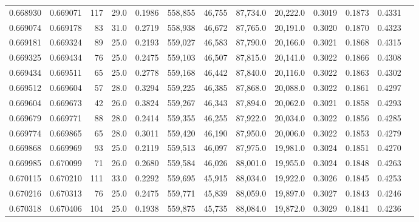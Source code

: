 \begin{tabular}{rrrrrrrrrrrrr}
0.668930 & 0.669071 &   117 & 29.0 &                                     0.1986 & 558,855 &  46,755 &  87,734.0 &  20,222.0 & 0.3019 & 0.1873 & 0.4331 \\
0.669074 & 0.669178 &    83 & 31.0 &                                     0.2719 & 558,938 &  46,672 &  87,765.0 &  20,191.0 & 0.3020 & 0.1870 & 0.4323 \\
0.669181 & 0.669324 &    89 & 25.0 &                                     0.2193 & 559,027 &  46,583 &  87,790.0 &  20,166.0 & 0.3021 & 0.1868 & 0.4315 \\
0.669325 & 0.669434 &    76 & 25.0 &                                     0.2475 & 559,103 &  46,507 &  87,815.0 &  20,141.0 & 0.3022 & 0.1866 & 0.4308 \\
0.669434 & 0.669511 &    65 & 25.0 &                                     0.2778 & 559,168 &  46,442 &  87,840.0 &  20,116.0 & 0.3022 & 0.1863 & 0.4302 \\
0.669512 & 0.669604 &    57 & 28.0 &                                     0.3294 & 559,225 &  46,385 &  87,868.0 &  20,088.0 & 0.3022 & 0.1861 & 0.4297 \\
0.669604 & 0.669673 &    42 & 26.0 &                                     0.3824 & 559,267 &  46,343 &  87,894.0 &  20,062.0 & 0.3021 & 0.1858 & 0.4293 \\
0.669679 & 0.669771 &    88 & 28.0 &                                     0.2414 & 559,355 &  46,255 &  87,922.0 &  20,034.0 & 0.3022 & 0.1856 & 0.4285 \\
0.669774 & 0.669865 &    65 & 28.0 &                                     0.3011 & 559,420 &  46,190 &  87,950.0 &  20,006.0 & 0.3022 & 0.1853 & 0.4279 \\
0.669868 & 0.669969 &    93 & 25.0 &                                     0.2119 & 559,513 &  46,097 &  87,975.0 &  19,981.0 & 0.3024 & 0.1851 & 0.4270 \\
0.669985 & 0.670099 &    71 & 26.0 &                                     0.2680 & 559,584 &  46,026 &  88,001.0 &  19,955.0 & 0.3024 & 0.1848 & 0.4263 \\
0.670115 & 0.670210 &   111 & 33.0 &                                     0.2292 & 559,695 &  45,915 &  88,034.0 &  19,922.0 & 0.3026 & 0.1845 & 0.4253 \\
0.670216 & 0.670313 &    76 & 25.0 &                                     0.2475 & 559,771 &  45,839 &  88,059.0 &  19,897.0 & 0.3027 & 0.1843 & 0.4246 \\
0.670318 & 0.670406 &   104 & 25.0 &                                     0.1938 & 559,875 &  45,735 &  88,084.0 &  19,872.0 & 0.3029 & 0.1841 & 0.4236 \\

\end{tabular}
